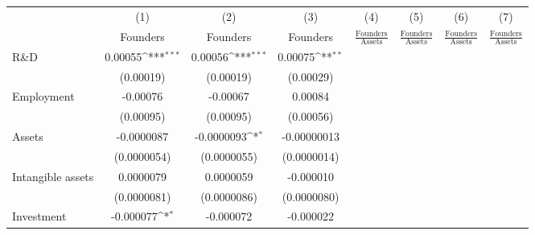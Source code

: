 {
\def\sym#1{\ifmmode^{#1}\else\(^{#1}\)\fi}
\begin{tabular}{l*{7}{c}}
\toprule
                    &\multicolumn{1}{c}{(1)}&\multicolumn{1}{c}{(2)}&\multicolumn{1}{c}{(3)}&\multicolumn{1}{c}{(4)}&\multicolumn{1}{c}{(5)}&\multicolumn{1}{c}{(6)}&\multicolumn{1}{c}{(7)}\\
                    &\multicolumn{1}{c}{Founders}&\multicolumn{1}{c}{Founders}&\multicolumn{1}{c}{Founders}&\multicolumn{1}{c}{$\frac{\textrm{Founders}}{\textrm{Assets}}$}&\multicolumn{1}{c}{$\frac{\textrm{Founders}}{\textrm{Assets}}$}&\multicolumn{1}{c}{$\frac{\textrm{Founders}}{\textrm{Assets}}$}&\multicolumn{1}{c}{$\frac{\textrm{Founders}}{\textrm{Assets}}$}\\
\midrule
R\&D                &     0.00055\sym{***}&     0.00056\sym{***}&     0.00075\sym{**} &                     &                     &                     &                     \\
                    &   (0.00019)         &   (0.00019)         &   (0.00029)         &                     &                     &                     &                     \\
\addlinespace
Employment          &    -0.00076         &    -0.00067         &     0.00084         &                     &                     &                     &                     \\
                    &   (0.00095)         &   (0.00095)         &   (0.00056)         &                     &                     &                     &                     \\
\addlinespace
Assets              &  -0.0000087         &  -0.0000093\sym{*}  & -0.00000013         &                     &                     &                     &                     \\
                    & (0.0000054)         & (0.0000055)         & (0.0000014)         &                     &                     &                     &                     \\
\addlinespace
Intangible assets   &   0.0000079         &   0.0000059         &   -0.000010         &                     &                     &                     &                     \\
                    & (0.0000081)         & (0.0000086)         & (0.0000080)         &                     &                     &                     &                     \\
\addlinespace
Investment          &   -0.000077\sym{*}  &   -0.000072         &   -0.000022         &                     &                     &                     &                     \\

\end{tabular}}

